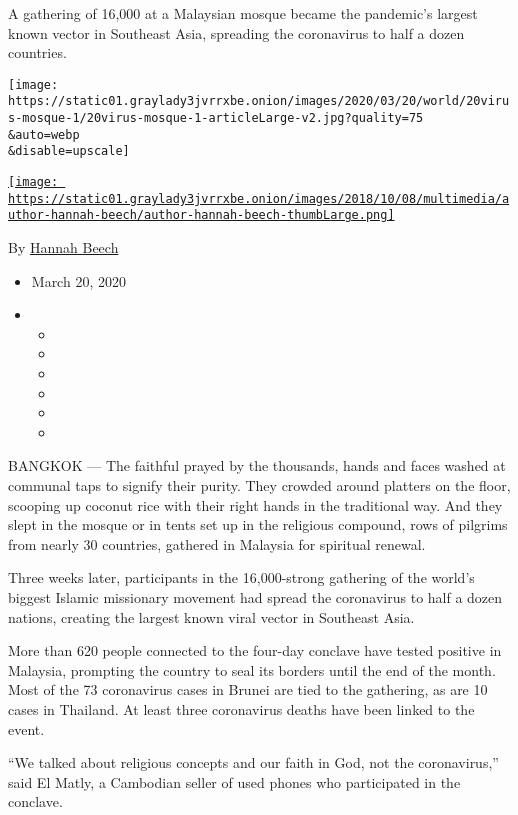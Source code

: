 A gathering of 16,000 at a Malaysian mosque became the pandemic's
largest known vector in Southeast Asia, spreading the coronavirus to
half a dozen countries.

\texttt{[image: https://static01.graylady3jvrrxbe.onion/images/2020/03/20/world/20virus-mosque-1/20virus-mosque-1-articleLarge-v2.jpg?quality=75\\\&auto=webp\\\&disable=upscale]}

\href{https://www.nytimes3xbfgragh.onion/by/hannah-beech}{\texttt{[image: https://static01.graylady3jvrrxbe.onion/images/2018/10/08/multimedia/author-hannah-beech/author-hannah-beech-thumbLarge.png]}}

By \href{https://www.nytimes3xbfgragh.onion/by/hannah-beech}{Hannah
Beech}

\begin{itemize}
\item
  March 20, 2020
\item
  \begin{itemize}
  \item
  \item
  \item
  \item
  \item
  \item
  \end{itemize}
\end{itemize}

BANGKOK --- The faithful prayed by the thousands, hands and faces washed
at communal taps to signify their purity. They crowded around platters
on the floor, scooping up coconut rice with their right hands in the
traditional way. And they slept in the mosque or in tents set up in the
religious compound, rows of pilgrims from nearly 30 countries, gathered
in Malaysia for spiritual renewal.

Three weeks later, participants in the 16,000-strong gathering of the
world's biggest Islamic missionary movement had spread the coronavirus
to half a dozen nations, creating the largest known viral vector in
Southeast Asia.

More than 620 people connected to the four-day conclave have tested
positive in Malaysia, prompting the country to seal its borders until
the end of the month. Most of the 73 coronavirus cases in Brunei are
tied to the gathering, as are 10 cases in Thailand. At least three
coronavirus deaths have been linked to the event.

``We talked about religious concepts and our faith in God, not the
coronavirus,'' said El Matly, a Cambodian seller of used phones who
participated in the conclave.

